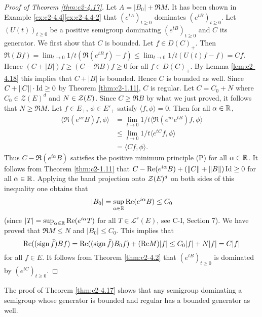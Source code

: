 \begin{proof}[Proof of Theorem \ref{thm:c2-4.17}]
Let $A = |B_{0}| + \Re M$. 
It has been shown in Example \ref{ex:c2-4.4}\ref{ex:c2-4.4-2} that $(e^{tA})_{t \geq 0}$ dominates $(e^{tB})_{t \geq 0}$.
Let $(U(t))_{t \geq 0}$ be a positive semigroup dominating $(e^{tB})_{t \geq 0}$ and $C$ its generator.
We first show that $C$ is bounded.
Let $f \in D(C)_{+}$. Then $\Re(Bf) = \lim_{t \to 0} 1/t(\Re(e^{tB}f) - f) \leq \lim_{t \to 0} 1/t(U(t)f - f) = Cf$.
Hence $(C + |B|)f \geq (C - \Re B)f \geq 0$ for all $f \in D(C)_{+}$.
By Lemma \ref{lem:c2-4.18} this implies that $C + |B|$ is bounded.
Hence $C$ is bounded as well.
Since $C + \|C\| \cdot \operatorname{Id} \geq 0$ by Theorem \ref{thm:c2-1.11}, $C$ is regular.
Let $C = C_{0} + N$ where $C_{0} \in \mathcal{Z}(E)^{d}$ and $N \in \mathcal{Z}(E)$.
Since $C \geq \Re B$ by what we just proved, it follows that $N \geq \Re M$.
Let $f \in E_{+}$, $\phi \in E'_{+}$ satisfy $\langle f,\phi \rangle = 0$.
Then for all $\alpha \in \mathbb{R}$,
\begin{align*}
\langle \Re(e^{i\alpha}B)f,\phi \rangle &= \lim_{t \to 0}1/t \langle \Re(e^{i\alpha}e^{tB})f,\phi \rangle \\
&\leq \lim_{t \to 0}1/t \langle e^{tC}f,\phi \rangle \\
&= \langle Cf,\phi \rangle.
\end{align*}
Thus $C - \Re(e^{i\alpha}B)$ satisfies the positive minimum principle (P) 
for all $\alpha \in \mathbb{R}$.
It follows from Theorem \ref{thm:c2-1.11} that $C - \mathop{}\!\mathrm{Re}(e^{i\alpha}B) + (\|C\|+\|B\|)\operatorname{Id} \geq 0$ for all $\alpha \in \mathbb{R}$.
Applying the band projection onto $\mathcal{Z}(E)^{d}$ on both sides of this inequality one obtains that
\[
|B_{0}| = \sup_{\alpha \in \mathbb{R}}\mathop{}\!\mathrm{Re}(e^{i\alpha}B) \leq C_{0} 
\]
(since $|T| = \sup_{\alpha \in \mathbb{R}}\mathop{}\!\mathrm{Re}(e^{i\alpha}T)$ for all $T \in \mathcal{L}^{r}(E)$, see C-I, Section 7).
We have proved that $\Re M \leq N$ and $|B_{0}| \leq C_{0}$.
This implies that
\[
\mathop{}\!\mathrm{Re}((\operatorname{sign}  \bar{f})Bf) = \mathop{}\!\mathrm{Re}((\operatorname{sign}  \bar{f})B_{0}f) + (\mathop{}\!\mathrm{Re} M)|f| \leq C_{0}|f| + N|f| = C|f|
\]
for all $f \in E$.
It follows from Theorem \ref{thm:c2-4.2}   that $(e^{tB})_{t \geq 0}$ is dominated by $(e^{tC})_{t \geq 0}$.
\end{proof}

\begin{remark*}
The proof of Theorem \ref{thm:c2-4.17}   shows that any semigroup dominating a semigroup whose generator is bounded and regular has a bounded generator as well.
\end{remark*}

